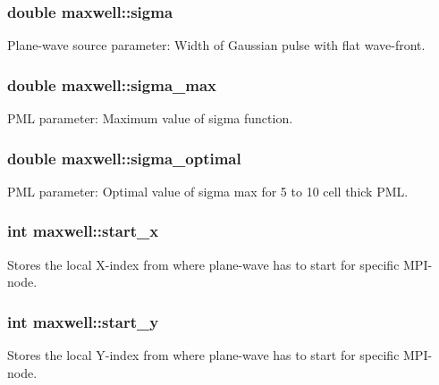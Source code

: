\subsubsection[{\texorpdfstring{sigma}{sigma}}]{\setlength{\rightskip}{0pt plus 5cm}double maxwell\+::sigma}\hypertarget{classmaxwell_a8e5a54fb0c9fe202e76efd43dbc184c3}{}\label{classmaxwell_a8e5a54fb0c9fe202e76efd43dbc184c3}
Plane-\/wave source parameter\+: Width of Gaussian pulse with flat wave-\/front. 
\subsubsection[{\texorpdfstring{sigma\+\_\+max}{sigma_max}}]{\setlength{\rightskip}{0pt plus 5cm}double maxwell\+::sigma\+\_\+max}\hypertarget{classmaxwell_af945b0a905935b2130eeb6c7a33eb478}{}\label{classmaxwell_af945b0a905935b2130eeb6c7a33eb478}
P\+ML parameter\+: Maximum value of sigma function. 
\subsubsection[{\texorpdfstring{sigma\+\_\+optimal}{sigma_optimal}}]{\setlength{\rightskip}{0pt plus 5cm}double maxwell\+::sigma\+\_\+optimal}\hypertarget{classmaxwell_a8e8b89b108a26764f803c39908d474da}{}\label{classmaxwell_a8e8b89b108a26764f803c39908d474da}
P\+ML parameter\+: Optimal value of sigma max for 5 to 10 cell thick P\+ML. 
\subsubsection[{\texorpdfstring{start\+\_\+x}{start_x}}]{\setlength{\rightskip}{0pt plus 5cm}int maxwell\+::start\+\_\+x}\hypertarget{classmaxwell_a74771f4501b47621a65bc635f1835391}{}\label{classmaxwell_a74771f4501b47621a65bc635f1835391}
Stores the local X-\/index from where plane-\/wave has to start for specific M\+P\+I-\/node. 
\subsubsection[{\texorpdfstring{start\+\_\+y}{start_y}}]{\setlength{\rightskip}{0pt plus 5cm}int maxwell\+::start\+\_\+y}\hypertarget{classmaxwell_a94431c9f918c0dd0dd64fa0f16b6e966}{}\label{classmaxwell_a94431c9f918c0dd0dd64fa0f16b6e966}
Stores the local Y-\/index from where plane-\/wave has to start for specific M\+P\+I-\/node. 
